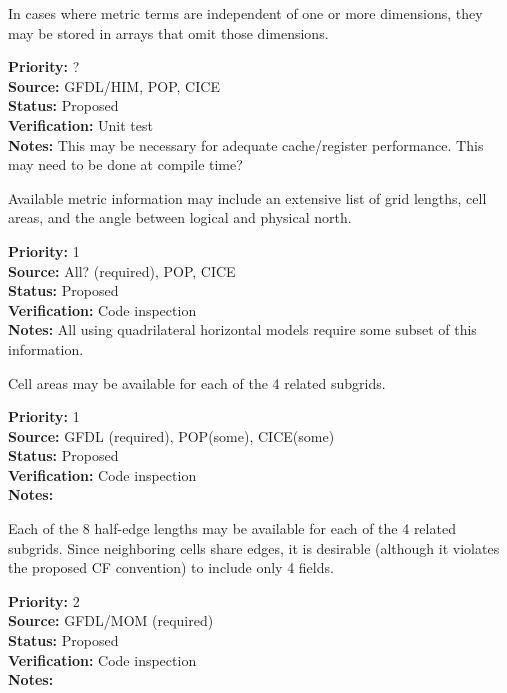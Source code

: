 In cases where metric terms are independent of one or more dimensions, they may be
stored in arrays that omit those dimensions.
\begin{reqlist}
{\bf Priority:} ? \\
{\bf Source:} GFDL/HIM, POP, CICE \\
{\bf Status:} Proposed \\
{\bf Verification:} Unit test \\
{\bf Notes:} This may be necessary for adequate cache/register performance.  This may
need to be done at compile time?
\end{reqlist}

Available metric information may include an extensive list of grid lengths, cell
areas, and the angle between logical and physical north.
\begin{reqlist}
{\bf Priority:} 1 \\
{\bf Source:} All? (required), POP, CICE \\
{\bf Status:} Proposed \\
{\bf Verification:} Code inspection \\
{\bf Notes:} All using quadrilateral horizontal models require some subset of this information.
\end{reqlist}

Cell areas may be available for each of the 4 related subgrids.
\begin{reqlist}
{\bf Priority:} 1 \\
{\bf Source:} GFDL (required), POP(some), CICE(some) \\
{\bf Status:} Proposed \\
{\bf Verification:} Code inspection \\
{\bf Notes:} 
\end{reqlist}

Each of the 8 half-edge lengths may be available for each of the 4 related
subgrids.  Since neighboring cells share edges, it is desirable (although it violates
the proposed CF convention) to include only 4 fields.
\begin{reqlist}
{\bf Priority:} 2 \\
{\bf Source:} GFDL/MOM (required) \\
{\bf Status:} Proposed \\
{\bf Verification:} Code inspection \\
{\bf Notes:} 
\end{reqlist}


